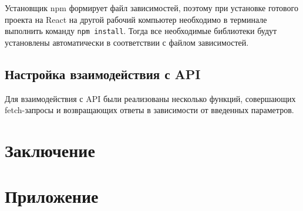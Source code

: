 \documentclass[a4paper,12pt]{article}
\begin{document}
Установщик npm формирует файл зависимостей, поэтому при установке готового проекта на React на другой рабочий компьютер необходимо в терминале выполнить команду \texttt{npm install}. Тогда все необходимые библиотеки будут установлены автоматически в соответствии с файлом зависимостей.

\subsection{Настройка взаимодействия с API}
Для взаимодействия с API были реализованы несколько функций, совершающих fetch-запросы и возвращающих ответы в зависимости от введенных параметров.






\newpage
\section*{Заключение}






\newpage
{}







\newpage
\section*{Приложение}



 
\end{document}
